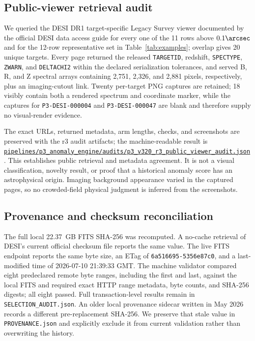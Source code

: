 \documentclass[twocolumn,linenumbers]{aastex702}
\newcommand{\repoBase}{https://github.com/Hubify-Projects/bigbounce/blob/main}
\newcommand{\artifact}[1]{\href{\repoBase/#1}{\nolinkurl{#1}}}
\begin{document}
\subsection{Public-viewer retrieval audit}\label{sec:viewer-audit}

We queried the DESI DR1 target-specific Legacy Survey viewer documented by the official DESI data
access guide for every one of the 11 rows above $0.1\arcsec$ and for the 12-row representative set
in Table~\ref{tab:examples}; overlap gives 20 unique targets.  Every page returned the released
\texttt{TARGETID}, redshift, \texttt{SPECTYPE}, \texttt{ZWARN}, and \texttt{DELTACHI2} within the
declared serialization tolerances, and served B, R, and Z spectral arrays containing 2,751,
2,326, and 2,881 pixels, respectively, plus an imaging-cutout link.  Twenty per-target PNG captures
are retained; 18 visibly contain both a rendered spectrum and coordinate marker, while the captures
for \texttt{P3-DESI-000004} and \texttt{P3-DESI-000047} are blank and therefore supply no visual-render evidence.

The exact URLs, returned metadata, arm lengths, checks, and screenshots are preserved with the r3
audit artifacts; the machine-readable result is
\artifact{pipelines/p3\_anomaly\_engine/audits/p3\_v320\_r3\_public\_viewer\_audit.json}.
This establishes public retrieval and metadata agreement.  It is not a visual classification,
novelty result, or proof that a historical anomaly score has an astrophysical origin.  Imaging
background appearance varied in the captured pages, so no crowded-field physical judgment is
inferred from the screenshots.

\subsection{Provenance and checksum reconciliation}\label{sec:checksums}

The full local 22.37~GB FITS SHA-256 was recomputed.  A no-cache retrieval of DESI's current
official checksum file reports the same value.  The live FITS endpoint reports the same byte size,
an ETag of \texttt{6a516695-5356e87c0}, and a last-modified time of 2026-07-10 21:39:33 GMT.  The
machine validator compared eight predeclared remote byte ranges, including the first and last,
against the local FITS and required exact HTTP range metadata, byte counts, and SHA-256 digests;
all eight passed.  Full transaction-level results remain in \texttt{SELECTION\_AUDIT.json}.  An older
local provenance sidecar written in May 2026 records a
different pre-replacement SHA-256.  We preserve that stale value in \texttt{PROVENANCE.json} and
explicitly exclude it from current validation rather than overwriting the history.
\end{document}
